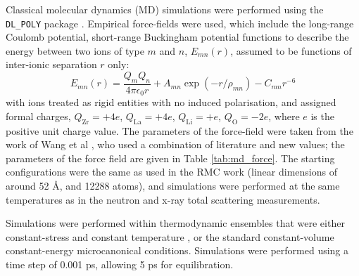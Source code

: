 \documentclass[twoside,twocolumn,9pt]{article}
\begin{document}
Classical molecular dynamics (MD) simulations were performed using the \texttt{DL\_POLY} package \cite{Todorov:2006ee}.
Empirical force-fields were used, which include the long-range Coulomb potential,
short-range Buckingham potential functions to describe the energy between two ions of type $m$ and $n$, $E_{mn}(r)$, assumed to be functions of inter-ionic separation $r$ only:
\begin{equation} \label{eq:buckingham}
E_{mn}(r) = \frac{Q_m Q_n}{4 \pi \epsilon_0 r} + A_{mn} \exp(-r/\rho_{mn}) - C_{mn}r^{-6}
\end{equation}
with ions treated as rigid entities with no induced polarisation, and assigned formal charges, $Q_\mathrm{Zr} = +4e$, $Q_\mathrm{La} = +4e$, $Q_\mathrm{Li} = +e$, $Q_\mathrm{O} = -2e$, where $e$ is the positive unit charge value. The parameters of the force-field were taken from the work of Wang et al  \cite{Wang:2014ic}, who used a combination of literature and new values; the parameters of the force field are given in Table \ref{tab:md_force}. The starting configurations were the same as used in the RMC work (linear dimensions of around 52 \AA, and 12288 atoms), and simulations were performed at the same temperatures as in the neutron and x-ray total scattering measurements.

Simulations were performed within thermodynamic ensembles that were either constant-stress \cite{Parrinello:1980kx, Melchionna:2006fi} and constant temperature \cite{Nose:1984bf, Hoover:1985cu}, or the standard constant-volume constant-energy microcanonical conditions. Simulations were performed using a time step of 0.001 ps, allowing 5 ps for equilibration.


\end{document}
